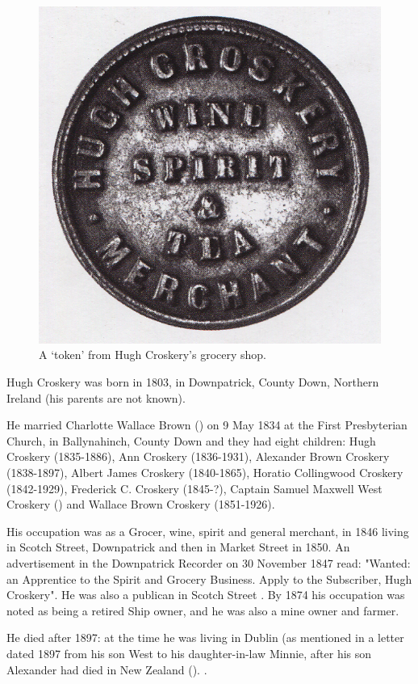 
\begin{figure}
 \centering
 \includegraphics{photos/Hugh_Croskery_token}
 \caption{A `token' from Hugh Croskery's grocery shop.\cite{DownTown2}}
\end{figure}

Hugh Croskery was born in 1803, in Downpatrick, County Down, Northern Ireland (his parents are not known).

He married Charlotte Wallace Brown () on 9 May 1834 at the First Presbyterian Church, in Ballynahinch, County Down and they had eight children:  Hugh Croskery (1835-1886), Ann Croskery (1836-1931), Alexander Brown Croskery (1838-1897), Albert James Croskery (1840-1865), Horatio Collingwood Croskery (1842-1929), Frederick C. Croskery (1845-?),  Captain Samuel Maxwell West Croskery () and Wallace Brown Croskery (1851-1926). 

His occupation was as a Grocer, wine, spirit and general merchant, in 1846 living in Scotch Street, Downpatrick and then in Market Street in 1850. An advertisement in the Downpatrick Recorder on 30 November 1847 read:
"Wanted: an Apprentice to the Spirit and Grocery Business. Apply to the Subscriber, Hugh Croskery". \cite{HCroskeryAdvert}  He was also a publican in Scotch Street \cite{HughCroskeryOccupation}. By 1874 his occupation was noted as being a retired Ship owner, and he was also a mine owner and farmer. 

He died after 1897: at the time he was living in Dublin (as mentioned in a letter dated 1897 from his son West to his daughter-in-law Minnie, after his son Alexander had died in New Zealand (). \cite{HughCroskeryDeath}.

